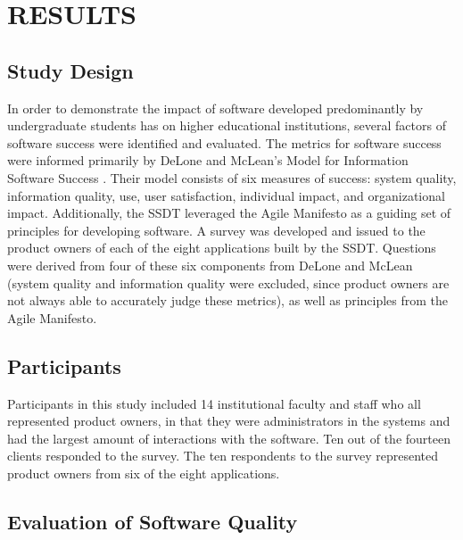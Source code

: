 \section{RESULTS}

\subsection{Study Design}
In order to demonstrate the impact of software developed predominantly by undergraduate students has on higher educational institutions, several factors of software success were identified and evaluated.  The metrics for software success were informed primarily by DeLone and McLean's Model for Information Software Success \cite{delone1992softwaresuccess}. Their model consists of six measures of success: system quality, information quality, use, user satisfaction, individual impact, and organizational impact. Additionally, the SSDT leveraged the Agile Manifesto \cite{agilemanifesto} as a guiding set of principles for developing software. A survey was developed and issued to the product owners of each of the eight applications built by the SSDT. Questions were derived from four of these six components from DeLone and McLean (system quality and information quality were excluded, since product owners are not always able to accurately judge these metrics), as well as principles from the Agile Manifesto. %

\subsection{Participants}
Participants in this study included 14 institutional faculty and staff who all represented product owners, in that they were administrators in the systems and had the largest amount of interactions with the software. Ten out of the fourteen clients responded to the survey. The ten respondents to the survey represented product owners from six of the eight applications.

\subsection{Evaluation of Software Quality}
